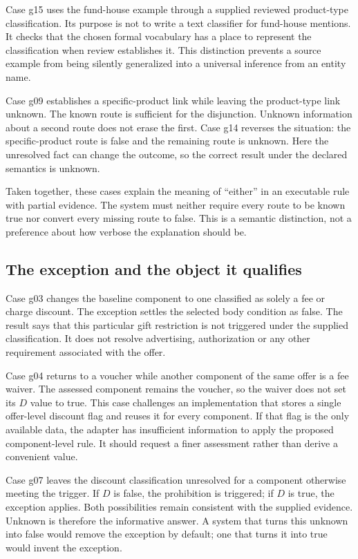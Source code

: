 \documentclass[12pt,a4paper,oneside,openany]{book}
\begin{document}
Case g15 uses the fund-house example through a supplied reviewed product-type
classification. Its purpose is not to write a text classifier for fund-house
mentions. It checks that the chosen formal vocabulary has a place to represent
the classification when review establishes it. This distinction prevents a
source example from being silently generalized into a universal inference from
an entity name.

Case g09 establishes a specific-product link while leaving the product-type
link unknown. The known route is sufficient for the disjunction. Unknown
information about a second route does not erase the first. Case g14 reverses
the situation: the specific-product route is false and the remaining route is
unknown. Here the unresolved fact can change the outcome, so the correct result
under the declared semantics is unknown.

Taken together, these cases explain the meaning of ``either'' in an executable
rule with partial evidence. The system must neither require every route to be
known true nor convert every missing route to false. This is a semantic
distinction, not a preference about how verbose the explanation should be.

\subsection{The exception and the object it qualifies}
Case g03 changes the baseline component to one classified as solely a fee or
charge discount. The exception settles the selected body condition as false.
The result says that this particular gift restriction is not triggered under
the supplied classification. It does not resolve advertising, authorization or
any other requirement associated with the offer.

Case g04 returns to a voucher while another component of the same offer is a
fee waiver. The assessed component remains the voucher, so the waiver does not
set its $D$ value to true. This case challenges an implementation that stores a
single offer-level discount flag and reuses it for every component. If that flag
is the only available data, the adapter has insufficient information to apply
the proposed component-level rule. It should request a finer assessment rather
than derive a convenient value.

Case g07 leaves the discount classification unresolved for a component otherwise
meeting the trigger. If $D$ is false, the prohibition is triggered; if $D$ is
true, the exception applies. Both possibilities remain consistent with the
supplied evidence. Unknown is therefore the informative answer. A system that
turns this unknown into false would remove the exception by default; one that
turns it into true would invent the exception.
\end{document}
